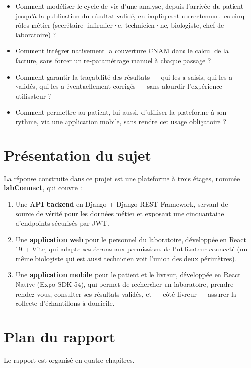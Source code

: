 \documentclass[12pt, a4paper, oneside]{report}
\begin{document}
\begin{itemize}
  \item Comment modéliser le cycle de vie d'une analyse, depuis l'arrivée
        du patient jusqu'à la publication du résultat validé, en
        impliquant correctement les cinq rôles métier (secrétaire,
        infirmier·e, technicien·ne, biologiste, chef de laboratoire) ?
  \item Comment intégrer nativement la couverture CNAM dans le calcul
        de la facture, sans forcer un re-paramétrage manuel à chaque
        passage ?
  \item Comment garantir la traçabilité des résultats — qui les a
        saisis, qui les a validés, qui les a éventuellement corrigés —
        sans alourdir l'expérience utilisateur ?
  \item Comment permettre au patient, lui aussi, d'utiliser la
        plateforme à son rythme, via une application mobile, sans rendre
        cet usage obligatoire ?
\end{itemize}

\section*{Présentation du sujet}
La réponse construite dans ce projet est une plateforme à trois étages,
nommée \textbf{labConnect}, qui couvre :

\begin{enumerate}
  \item Une \textbf{API backend} en Django + Django REST Framework,
        servant de source de vérité pour les données métier et exposant
        une cinquantaine d'endpoints sécurisés par JWT.
  \item Une \textbf{application web} pour le personnel du laboratoire,
        développée en React 19 + Vite, qui adapte ses écrans aux
        permissions de l'utilisateur connecté (un même biologiste qui
        est aussi technicien voit l'union des deux périmètres).
  \item Une \textbf{application mobile} pour le patient et le livreur,
        développée en React Native (Expo SDK 54), qui permet de
        rechercher un laboratoire, prendre rendez-vous, consulter ses
        résultats validés, et — côté livreur — assurer la collecte
        d'échantillons à domicile.
\end{enumerate}

\section*{Plan du rapport}
Le rapport est organisé en quatre chapitres.
\end{document}
